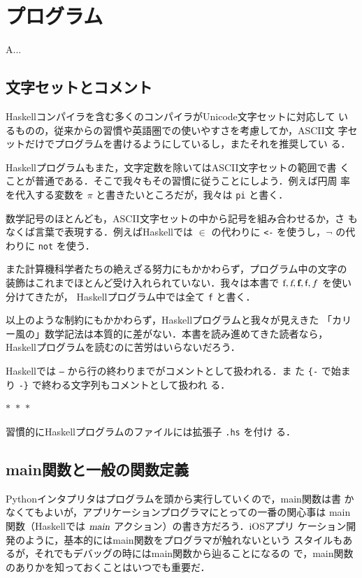 \documentclass[a5paper,twoside,fleqn]{jsbook}
\newcommand{\separator}{\begin{center}$*$~$*$~$*$\end{center}}
\newcommand{\programminglanguage}[1]{\textsf{#1}}
\newcommand{\haskell}{\programminglanguage{Haskell}}
\newcommand{\python}{\programminglanguage{Python}}
\newenvironment{leader}{\begingroup\gt}{\endgroup}
\newcommand{\code}[1]{\texttt{#1}}
\newcommand{\filename}[1]{\texttt{#1}}
\newcommand{\mAction}[1]{\textsl{#1}}
\DeclareMathOperator{\mMain}{\mAction{main}}
\DeclareMathOperator{\mFrom}{\in}
\begin{document}
\chapter{プログラム}

\begin{leader}
A...
\end{leader}


\section{文字セットとコメント}

\haskell コンパイラを含む多くのコンパイラがUnicode文字セットに対応して
いるものの，従来からの習慣や英語圏での使いやすさを考慮してか，ASCII文
字セットだけでプログラムを書けるようにしているし，またそれを推奨してい
る．

\haskell プログラムもまた，文字定数を除いてはASCII文字セットの範囲で書
くことが普通である．そこで我々もその習慣に従うことにしよう．例えば円周
率を代入する変数を $\pi$ と書きたいところだが，我々は \code{pi} と書く．

数学記号のほとんども，ASCII文字セットの中から記号を組み合わせるか，さ
もなくば言葉で表現する．例えば\haskell では $\mFrom$ の代わりに
\code{<-} を使うし，$\neg$ の代わりに \code{not} を使う．

また計算機科学者たちの絶えざる努力にもかかわらず，プログラム中の文字の
装飾はこれまでほとんど受け入れられていない．我々は本書で
$\textrm{f},\textsl{f},\textbf{f},\textsf{f},f$ を使い分けてきたが，
\haskell プログラム中では全て \code{f} と書く．

以上のような制約にもかかわらず，\haskell プログラムと我々が見えきた
「カリー風の」数学記法は本質的に差がない．本書を読み進めてきた読者なら，
\haskell プログラムを読むのに苦労はいらないだろう．

\haskell では \code{--} から行の終わりまでがコメントとして扱われる．ま
た \code{\{-} で始まり \code{-\}} で終わる文字列もコメントとして扱われ
る．

\separator

習慣的に\haskell プログラムのファイルには拡張子 \filename{.hs} を付け
る．

\section{main関数と一般の関数定義}

\python インタプリタはプログラムを頭から実行していくので，main関数は書
かなくてもよいが，アプリケーションプログラマにとっての一番の関心事は
main関数（\haskell では $\mMain$ アクション）の書き方だろう．iOSアプリ
ケーション開発のように，基本的にはmain関数をプログラマが触れないという
スタイルもあるが，それでもデバッグの時にはmain関数から辿ることになるの
で，main関数のありかを知っておくことはいつでも重要だ．
\end{document}
